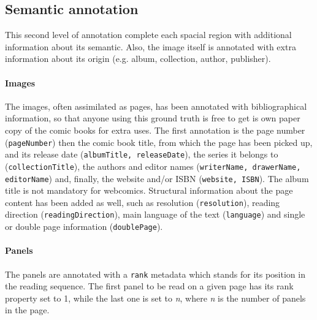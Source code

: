\subsection{Semantic annotation} %
\label{sub:gt:semantic_annotation}
This second level of annotation complete each spacial region with additional information about its semantic.
Also, the image itself is annotated with extra information about its origin (e.g. album, collection, author, publisher).

\paragraph{Images}
The images, often assimilated as pages, has been annotated with bibliographical information, so that anyone using this ground truth is free to get is own paper copy of the comic books for extra uses.
The first annotation is the page number (\texttt{{pageNumber}}) then the comic book title, from which the page has been picked up, and its release date (\texttt{{albumTitle, releaseDate}}), the series it belongs to (\texttt{{collectionTitle}}), the authors and editor names (\texttt{{writerName, drawerName, editorName}}) and, finally, the website and/or ISBN (\texttt{{website, ISBN}}).
The album title is not mandatory for webcomics.
Structural information about the page content has been added as well, such as resolution (\texttt{{resolution}}), reading direction (\texttt{{readingDirection}}), main language of the text (\texttt{{language}}) and single or double page information (\texttt{{doublePage}}).

\paragraph{Panels} 
The panels are annotated with a \texttt{{rank}} metadata which stands for its position in the reading sequence. 
The first panel to be read on a given page has its rank property set to 1, while the last one is set to \textit{n}, where \textit{n} is the number of panels in the page.

